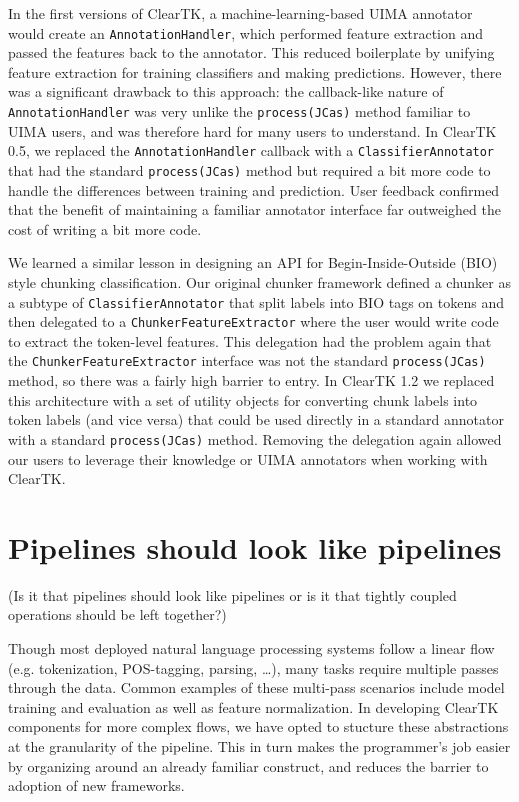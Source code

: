 \documentclass[10pt, a4paper]{article}
\newcommand{\code}[1]{\texttt{\small #1}}
\begin{document}
In the first versions of ClearTK, a machine-learning-based UIMA annotator would create an \code{AnnotationHandler}, which performed feature extraction and passed the features back to the annotator.
This reduced boilerplate by unifying feature extraction for training classifiers and making predictions.
However, there was a significant drawback to this approach:
the callback-like nature of \code{AnnotationHandler} was very unlike the \code{process(JCas)} method familiar to UIMA users, and was therefore hard for many users to understand.
In ClearTK 0.5, we replaced the \code{AnnotationHandler} callback with a \code{ClassifierAnnotator} that had the standard \code{process(JCas)} method but required a bit more code to handle the differences between training and prediction.
User feedback confirmed that the benefit of maintaining a familiar annotator interface far outweighed the cost of writing a bit more code.

We learned a similar lesson in designing an API for Begin-Inside-Outside (BIO) style chunking classification.
Our original chunker framework defined a chunker as a subtype of \code{ClassifierAnnotator} that split labels into BIO tags on tokens and then delegated to a \code{ChunkerFeatureExtractor} where the user would write code to extract the token-level features.
This delegation had the problem again that the \code{ChunkerFeatureExtractor} interface was not the standard \code{process(JCas)} method, so there was a fairly high barrier to entry.
In ClearTK 1.2 we replaced this architecture with a set of utility objects for converting chunk labels into token labels (and vice versa) that could be used directly in a standard annotator with a standard \code{process(JCas)} method.
Removing the delegation again allowed our users to leverage their knowledge or UIMA annotators when working with ClearTK.


\section{Pipelines should look like pipelines}

(Is it that pipelines should look like pipelines or is it that tightly coupled operations should be left together?)

Though most deployed natural language processing systems follow a linear flow (e.g. tokenization, POS-tagging, parsing, \ldots), many tasks require multiple passes through the data.  Common examples of these multi-pass scenarios include model training and evaluation as well as feature normalization.  In developing ClearTK components for more complex flows, we have opted to stucture these abstractions at the granularity of the pipeline.  This in turn makes the programmer's job easier by organizing around an already familiar construct, and reduces the barrier to adoption of new frameworks.
\end{document}
